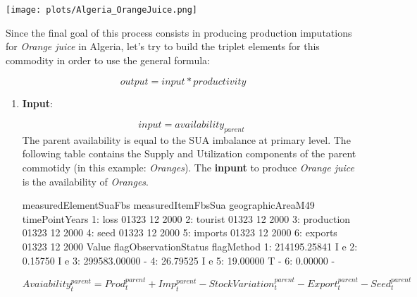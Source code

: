 \documentclass[nojss]{jss}
\begin{document}
  \texttt{[image: plots/Algeria\_OrangeJuice.png]}
  
  Since the final goal of this process consists in producing production imputations for \textit{Orange juice} in Algeria, let's try to build   the triplet elements for this commodity in order to use the general formula:
  
  \begin{dmath*}
  output=input*productivity
  \end{dmath*}
 
  \begin{enumerate}
         \item{  \textbf{Input}:
  
             \begin{dmath*}
              input= availability_{parent}
             \end{dmath*}
The parent availability is equal to the SUA imbalance at primary level. The following table contains the Supply and Utilization components of the parent commotidy (in this example: \textit{Oranges}). The \textbf{inpunt} to produce \textit{Orange juice} is the availability of \textit{Oranges}.  


\begin{Schunk}
\begin{Soutput}
   measuredElementSuaFbs measuredItemFbsSua geographicAreaM49 timePointYears
1:                  loss              01323                12           2000
2:               tourist              01323                12           2000
3:            production              01323                12           2000
4:                  seed              01323                12           2000
5:               imports              01323                12           2000
6:               exports              01323                12           2000
          Value flagObservationStatus flagMethod
1: 214195.25841                     I          e
2:      0.15750                     I          e
3: 299583.00000                                -
4:     26.79525                     I          e
5:     19.00000                     T          -
6:      0.00000                                -
\end{Soutput}
\end{Schunk}


            \begin{dmath*}
            Avaiability_{t}^{parent}=Prod_{t}^{parent}+Imp_{t}^{parent}-StockVariation_{t}^{parent} - Export_{t}^{parent}-Seed_{t}^{parent}
            \end{dmath*}

}
\end{enumerate}
\end{document}
